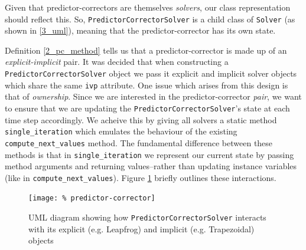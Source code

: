 \documentclass[12pt, twoside]{report}
\theoremstyle{plain}
\theoremstyle{definition}
\theoremstyle{definition}
\begin{document}
            Given that predictor-correctors are themselves \textit{solvers}, 
            our class representation should reflect this. So, 
            \texttt{PredictorCorrectorSolver} is a 
            child class of \texttt{Solver} (as shown in 
            \ref{3_uml}), meaning that the predictor-corrector has its own 
            state. 

            Definition \ref{2_pc_method} tells us that a predictor-corrector
            is made up of an \textit{explicit-implicit} pair. It was decided 
            that when constructing a 
            \texttt{PredictorCorrectorSolver} object we 
            pass it explicit and implicit solver objects which share the same
            \texttt{ivp} attribute. One issue which arises from 
            this design is that of \textit{ownership}. Since we are interested
            in the predictor-corrector \textit{pair}, we want to ensure that we
            are updating the \texttt{PredictorCorrectorSolver}'s 
            state at each time step accordingly. We acheive this by giving all
            solvers a static method \texttt{single_iteration} which
            emulates the behaviour of the existing 
            \texttt{compute_next_values} method. The fundamental 
            difference between these methods is that in 
            \texttt{single_iteration} we represent our current
            state by passing method arguments and returning values--rather than
            updating instance variables (like in 
            \texttt{compute_next_values}). Figure \ref{3_pc_uml} 
            briefly outlines these interactions.

            \begin{figure}
                \centering
                    \texttt{[image: \%
                    predictor-corrector]}
                    \caption{UML diagram showing how 
                    \texttt{PredictorCorrectorSolver} interacts 
                    with its explicit (e.g. Leapfrog) and implicit 
                    (e.g. Trapezoidal) objects}
                    \label{3_pc_uml}
            \end{figure}
\end{document}
